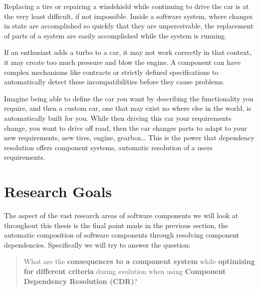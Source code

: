 Replacing a tire or repairing a windshield while continuing to drive the car is at the very least difficult, if not impossible.
Inside a software system, where changes in state are accomplished so quickly that they are unperceivable, the replacement of parts of a system are easily accomplished while the system is running.

If an enthusiast adds a turbo to a car, it may not work correctly in that context, it may create too much pressure and blow the engine.
A component can have complex mechanisms like contracts or strictly defined specifications to automatically detect these incompatibilities before they cause problems.

Imagine being able to define the car you want by describing the functionality you require, and then a custom car, one that may exist no where else in the world,
is automatically built for you. 
While then driving this car your requirements change, you want to drive off road, then the car changes parts to adapt to your new requirements, new tires, engine, gearbox\ldots
This is the power that dependency resolution offers component systems, automatic resolution of a users requirements.

\section{Research Goals}
{}The aspect of the vast research areas of software components we will look at throughout this thesis is the final point made in the previous section, 
{}the automatic composition of software components through resolving component dependencies.
{}Specifically we will try to answer the question:\\
{}\begin{quote}
{}What are the \textbf{consequences to a component system} while \textbf{optimising for different criteria} during evolution when using \textbf{Component Dependency Resolution (CDR)}?
{}\end{quote}

